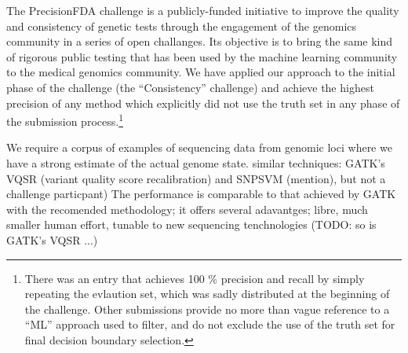 \documentclass{article}
\begin{document}
The PrecisionFDA challenge is a publicly-funded initiative to improve the quality and consistency of genetic tests through the engagement of the genomics community in a series of open challanges.
Its objective is to bring the same kind of rigorous public testing that has been used by the machine learning community to the medical genomics community.
We have applied our approach to the initial phase of the challenge (the ``Consistency'' challenge) and achieve the highest precision of any method which explicitly did not use the truth set in any phase of the submission process.\footnote{There was an entry that achieves 100 \% precision and recall by simply repeating the evlaution set, which was sadly distributed at the beginning of the challenge. Other submissions provide no more than vague reference to a ``ML'' approach used to filter, and do not exclude the use of the truth set for final decision boundary selection.}


We require a corpus of examples of sequencing data from genomic loci where we have a strong estimate of the actual genome state. %
 similar techniques: GATK's VQSR (variant quality score recalibration) and SNPSVM (mention), but not a challenge particpant)
The performance is comparable to that achieved by GATK with the recomended methodology; it offers several adavantges; libre, much smaller human effort, tunable to new sequencing tenchnologies (TODO: so is GATK's VQSR ...) 
\end{document}
